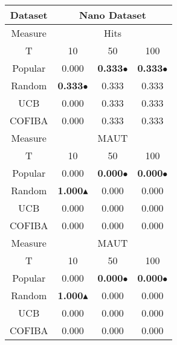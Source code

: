\documentclass{standalone}
\begin{document}
    \begin{tabular}{|c|ccc|}
    \hline
    \rowcolor{StrongGray}
    Dataset & \multicolumn{3}{c|}{Nano Dataset} \\
\hline
\hline
\rowcolor{Gray}
Measure & \multicolumn{3}{c|}{Hits} \\
\hline
\rowcolor{Gray}
T & 10 & 50 & 100 \\
\hline
\hline
Popular & 0.000 & \textbf{0.333\textcolor[rgb]{0.7,0.7,0.0}{$\bullet$}} & \textbf{0.333\textcolor[rgb]{0.7,0.7,0.0}{$\bullet$}}\\\hline
Random & \textbf{0.333\textcolor[rgb]{0.7,0.7,0.0}{$\bullet$}} & 0.333 & 0.333\\\hline
UCB & 0.000 & 0.333 & 0.333\\\hline
COFIBA & 0.000 & 0.333 & 0.333\\\hline

\hline
\hline
\rowcolor{Gray}
Measure & \multicolumn{3}{c|}{MAUT} \\
\hline
\rowcolor{Gray}
T & 10 & 50 & 100 \\
\hline
\hline
Popular & 0.000 & \textbf{0.000\textcolor[rgb]{0.7,0.7,0.0}{$\bullet$}} & \textbf{0.000\textcolor[rgb]{0.7,0.7,0.0}{$\bullet$}}\\\hline
Random & \textbf{1.000\textcolor[rgb]{00,0.45,0.10}{$\blacktriangle$}} & 0.000 & 0.000\\\hline
UCB & 0.000 & 0.000 & 0.000\\\hline
COFIBA & 0.000 & 0.000 & 0.000\\\hline

\hline
\hline
\rowcolor{Gray}
Measure & \multicolumn{3}{c|}{MAUT} \\
\hline
\rowcolor{Gray}
T & 10 & 50 & 100 \\
\hline
\hline
Popular & 0.000 & \textbf{0.000\textcolor[rgb]{0.7,0.7,0.0}{$\bullet$}} & \textbf{0.000\textcolor[rgb]{0.7,0.7,0.0}{$\bullet$}}\\\hline
Random & \textbf{1.000\textcolor[rgb]{00,0.45,0.10}{$\blacktriangle$}} & 0.000 & 0.000\\\hline
UCB & 0.000 & 0.000 & 0.000\\\hline
COFIBA & 0.000 & 0.000 & 0.000\\\hline

    \end{tabular}
    
\end{document}
